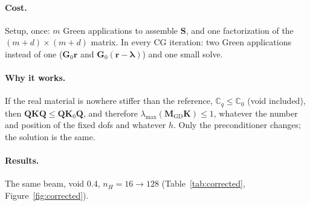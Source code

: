 \documentclass[11pt,a4paper]{article}
\begin{document}
\paragraph{Cost.} Setup, once: $m$ Green applications to assemble $\mathbf{S}$, and one factorization of the
$(m+d)\times(m+d)$ matrix. In every CG iteration: two Green applications instead of one ($\mathbf{G}_0\mathbf{r}$ and
$\mathbf{G}_0(\mathbf{r} - \boldsymbol{\lambda})$) and one small solve.

\paragraph{Why it works.} If the real material is nowhere stiffer than the reference, $\mathbb{C}_q \le \mathbb{C}_0$
(void included), then $\mathbf{Q}\mathbf{K}\mathbf{Q} \le \mathbf{Q}\mathbf{K}_0\mathbf{Q}$, and therefore
$\lambda_{\max}(\mathbf{M}_{\mathrm{GD}}\mathbf{K}) \le 1$, whatever the number and position of the fixed dofs and
whatever $h$. Only the preconditioner changes; the solution is the same.

\paragraph{Results.} The same beam, void 0.4, $n_H = 16 \to 128$ (Table~\ref{tab:corrected}, Figure~\ref{fig:corrected}).
\end{document}
